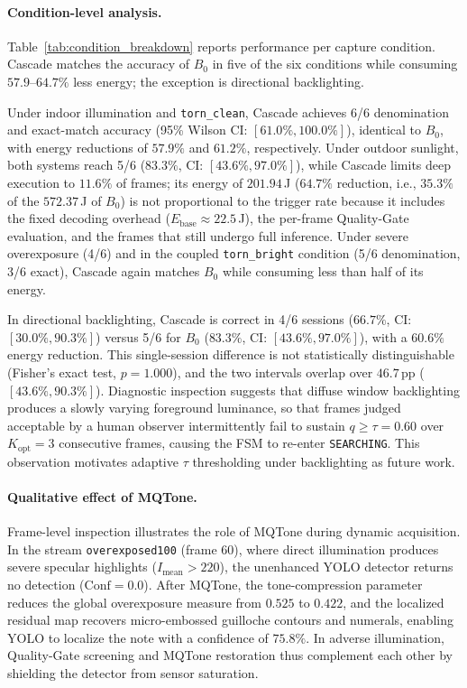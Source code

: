 \documentclass[final,5p,times,twocolumn,authoryear]{elsarticle}
\begin{document}
\paragraph{Condition-level analysis.}
Table~\ref{tab:condition_breakdown} reports performance per capture condition. Cascade matches the accuracy of $B_0$ in five of the six conditions while consuming $57.9$--$64.7\%$ less energy; the exception is directional backlighting.

Under indoor illumination and \texttt{torn\_clean}, Cascade achieves 6/6 denomination and exact-match accuracy (95\% Wilson CI: $[61.0\%, 100.0\%]$), identical to $B_0$, with energy reductions of $57.9\%$ and $61.2\%$, respectively. Under outdoor sunlight, both systems reach 5/6 ($83.3\%$, CI: $[43.6\%, 97.0\%]$), while Cascade limits deep execution to $11.6\%$ of frames; its energy of $201.94$\,J ($64.7\%$ reduction, i.e., $35.3\%$ of the $572.37$\,J of $B_0$) is not proportional to the trigger rate because it includes the fixed decoding overhead ($E_{\text{base}} \approx 22.5$\,J), the per-frame Quality-Gate evaluation, and the frames that still undergo full inference. Under severe overexposure (4/6) and in the coupled \texttt{torn\_bright} condition (5/6 denomination, 3/6 exact), Cascade again matches $B_0$ while consuming less than half of its energy.

In directional backlighting, Cascade is correct in 4/6 sessions ($66.7\%$, CI: $[30.0\%, 90.3\%]$) versus 5/6 for $B_0$ ($83.3\%$, CI: $[43.6\%, 97.0\%]$), with a $60.6\%$ energy reduction. This single-session difference is not statistically distinguishable (Fisher's exact test, $p = 1.000$), and the two intervals overlap over $46.7$\,pp ($[43.6\%, 90.3\%]$). Diagnostic inspection suggests that diffuse window backlighting produces a slowly varying foreground luminance, so that frames judged acceptable by a human observer intermittently fail to sustain $q \ge \tau = 0.60$ over $K_{\text{opt}} = 3$ consecutive frames, causing the FSM to re-enter \texttt{SEARCHING}. This observation motivates adaptive $\tau$ thresholding under backlighting as future work.

\paragraph{Qualitative effect of MQTone.}
Frame-level inspection illustrates the role of MQTone during dynamic acquisition. In the stream \texttt{overexposed100} (frame 60), where direct illumination produces severe specular highlights ($I_{\text{mean}} > 220$), the unenhanced YOLO detector returns no detection ($\text{Conf} = 0.0$). After MQTone, the tone-compression parameter reduces the global overexposure measure from $0.525$ to $0.422$, and the localized residual map recovers micro-embossed guilloche contours and numerals, enabling YOLO to localize the note with a confidence of $75.8\%$. In adverse illumination, Quality-Gate screening and MQTone restoration thus complement each other by shielding the detector from sensor saturation.
\end{document}
